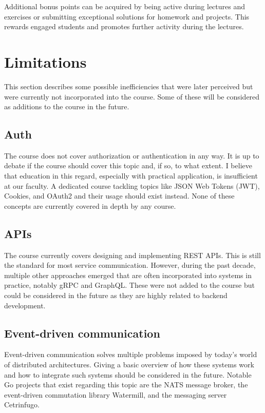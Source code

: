 \documentclass[
  digital,
  color,
  oneside,
  nosansbold,
  nocolorbold,
  nolof,
  nolot,
]{fithesis4}
\begin{document}
Additional bonus points can be acquired by being active during lectures and exercises or submitting exceptional solutions for homework and projects. This rewards engaged students and promotes further activity during the lectures.

\section{Limitations}

This section describes some possible inefficiencies that were later perceived but were currently not incorporated into the course. Some of these will be considered as additions to the course in the future.

\subsection{Auth}

The course does not cover authorization or authentication in any way. It is up to debate if the course should cover this topic and, if so, to what extent. I believe that education in this regard, especially with practical application, is insufficient at our faculty. A dedicated course tackling topics like JSON Web Tokens (JWT)\cite{jwt}, Cookies, and OAuth2\cite{oauth2} and their usage should exist instead. None of these concepts are currently covered in depth by any course.

\subsection{APIs}

The course currently covers designing and implementing REST APIs. This is still the standard for most service communication. However, during the past decade, multiple other approaches emerged that are often incorporated into systems in practice, notably gRPC\cite{grpc} and GraphQL\cite{graphql}. These were not added to the course but could be considered in the future as they are highly related to backend development.

\subsection{Event-driven communication}\label{edc}

Event-driven communication solves multiple problems imposed by today's world of distributed architectures. Giving a basic overview of how these systems work and how to integrate such systems should be considered in the future. Notable Go projects that exist regarding this topic are the NATS\cite{nats} message broker, the event-driven commutation library Watermill\cite{watermill}, and the messaging server Cetrinfugo\cite{centrifugo}.
\end{document}
